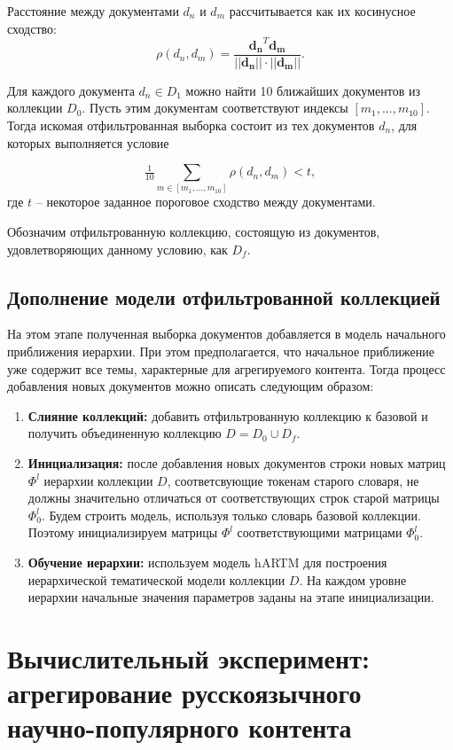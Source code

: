 Расстояние между документами $d_n$ и $d_m$ рассчитывается как их косинусное сходство:
$$\rho(d_n, d_m) = \dfrac{\boldsymbol{d_n }^T \boldsymbol{d_m }}{||\boldsymbol{d_n }|| \cdot ||\boldsymbol{d_m }||}.$$

Для каждого документа $d_n \in D_1$ можно найти 10 ближайших документов из коллекции $D_0$. Пусть этим документам соответствуют индексы $[m_1, ..., m_{10}]$. Тогда искомая отфильтрованная выборка состоит из тех документов $d_n$, для которых выполняется условие

$$\tfrac{1}{10}\sum_{m \in [m_1, ..., m_{10}]}\rho(d_n, d_m) < t,$$
где $t$ -- некоторое заданное пороговое сходство между документами.

Обозначим отфильтрованную коллекцию, состоящую из документов, удовлетворяющих данному условию, как $D_f$.

\subsection{Дополнение модели отфильтрованной коллекцией}
На этом этапе полученная выборка документов добавляется в модель начального приближения иерархии. 
При этом предполагается, что начальное приближение уже содержит все темы, характерные для агрегируемого контента. Тогда процесс добавления новых документов можно описать следующим образом:

\begin{enumerate}
	\item \textbf{Слияние коллекций:} добавить отфильтрованную коллекцию к базовой и получить объединенную коллекцию $D = D_0 \cup D_f$.
	\item \textbf{Инициализация:} после добавления новых документов строки новых матриц $\Phi^l$ иерархии коллекции $D$, соответсвующие токенам старого словаря, не должны значительно отличаться от соответствующих строк старой матрицы $\Phi^l_0$. Будем строить модель, используя только словарь базовой коллекции. Поэтому инициализируем матрицы $\Phi^l$ соответствующими матрицами $\Phi^l_0$.  
	\item \textbf{Обучение иерархии:} используем модель hARTM для построения иерархической тематической модели коллекции $D$. На каждом уровне иерархии начальные значения параметров заданы на этапе инициализации.
\end{enumerate}


\section{Вычислительный эксперимент: агрегирование русскоязычного научно-популярного контента}

